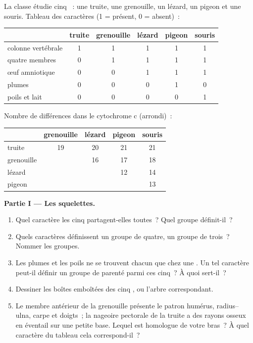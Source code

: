 \begin{problem}
\label{pb:g10:common-ancestry:1}
La classe étudie cinq ~: une truite, une grenouille, un lézard,
un pigeon et une souris. Tableau des caractères (1 = présent,
0 = absent)~:

\begin{center}
\begin{tabular}{lccccc}
 & truite & grenouille & lézard & pigeon & souris \\ \hline
colonne vertébrale & 1 & 1 & 1 & 1 & 1 \\
quatre membres & 0 & 1 & 1 & 1 & 1 \\
œuf amniotique & 0 & 0 & 1 & 1 & 1 \\
plumes & 0 & 0 & 0 & 1 & 0 \\
poils et lait & 0 & 0 & 0 & 0 & 1 \\
\end{tabular}
\end{center}

Nombre de différences dans le cytochrome c (arrondi)~:

\begin{center}
\begin{tabular}{lcccc}
 & grenouille & lézard & pigeon & souris \\ \hline
truite & 19 & 20 & 21 & 21 \\
grenouille & & 16 & 17 & 18 \\
lézard & & & 12 & 14 \\
pigeon & & & & 13 \\
\end{tabular}
\end{center}

\medskip
\noindent\textbf{Partie I --- Les squelettes.}
\begin{enumerate}
  \item Quel caractère les cinq  partagent-elles toutes~? Quel
        groupe définit-il~?
  \item Quels caractères définissent un groupe de quatre, un groupe de
        trois~? Nommer les groupes.
  \item Les plumes et les poils ne se trouvent chacun que chez une
        . Un tel caractère peut-il définir un groupe de parenté
        parmi ces cinq~? À quoi sert-il~?
  \item Dessiner les boîtes emboîtées des cinq , ou l'arbre
        correspondant.
  \item Le membre antérieur de la grenouille présente le patron
        humérus, radius--ulna, carpe et doigts~; la nageoire pectorale
        de la truite a des rayons osseux en éventail sur une petite
        base. Lequel est homologue de votre bras~? À quel caractère du
        tableau cela correspond-il~?
\end{enumerate}


\end{problem}
